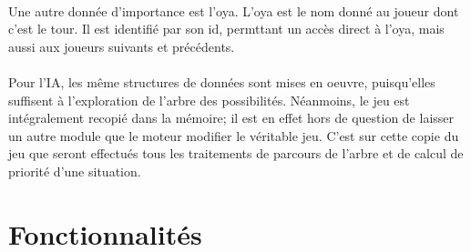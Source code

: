 \documentclass{report}
\begin{document}
        \paragraph*{} %
        Une autre donnée d'importance est l'oya. L'oya est le nom donné au joueur dont c'est le tour. Il est identifié par son id, permttant un accès direct à l'oya, 
        mais aussi aux joueurs suivants et précédents.

        \paragraph*{} %
        Pour l'IA, les même structures de données sont mises en oeuvre, puisqu'elles suffisent à l'exploration de l'arbre des possibilités. Néanmoins, le jeu est intégralement recopié
        dans la mémoire; il est en effet hors de question de laisser un autre module que le moteur modifier le véritable jeu. C'est sur cette copie du jeu que seront effectués 
        tous les traitements de parcours de l'arbre et de calcul de priorité d'une situation. 


    \newpage
    \section*{Fonctionnalités} %
        \paragraph*{}
\end{document}
